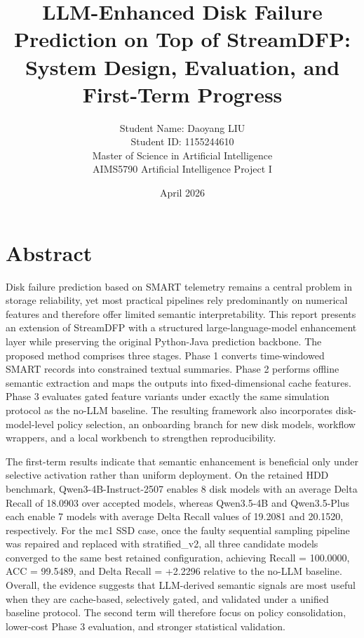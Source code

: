 \documentclass[
  11pt,
  a4paper]{article}
\title{LLM-Enhanced Disk Failure Prediction on Top of StreamDFP: System
Design, Evaluation, and First-Term Progress}
\author{Student Name: Daoyang LIU\\
Student ID: 1155244610\\
Master of Science in Artificial Intelligence\\
AIMS5790 Artificial Intelligence Project I}
\date{April 2026}
\begin{document}
\hypersetup{pageanchor=false}


\hypersetup{pageanchor=true}
{
\setcounter{tocdepth}{2}
\footnotesize
{}
\setlength{\parskip}{0pt}
\tableofcontents
}
\clearpage
{}
\hypertarget{abstract}{%
\section{Abstract}\label{abstract}}

Disk failure prediction based on SMART telemetry remains a central
problem in storage reliability, yet most practical pipelines rely
predominantly on numerical features and therefore offer limited semantic
interpretability. This report presents an extension of StreamDFP with a
structured large-language-model enhancement layer while preserving the
original Python-Java prediction backbone. The proposed method comprises
three stages. Phase 1 converts time-windowed SMART records into
constrained textual summaries. Phase 2 performs offline semantic
extraction and maps the outputs into fixed-dimensional cache features.
Phase 3 evaluates gated feature variants under exactly the same
simulation protocol as the no-LLM baseline. The resulting framework also
incorporates disk-model-level policy selection, an onboarding branch for
new disk models, workflow wrappers, and a local workbench to strengthen
reproducibility.

The first-term results indicate that semantic enhancement is beneficial
only under selective activation rather than uniform deployment. On the
retained HDD benchmark, Qwen3-4B-Instruct-2507 enables 8 disk models
with an average Delta Recall of 18.0903 over accepted models, whereas
Qwen3.5-4B and Qwen3.5-Plus each enable 7 models with average Delta
Recall values of 19.2081 and 20.1520, respectively. For the mc1 SSD
case, once the faulty sequential sampling pipeline was repaired and
replaced with stratified\_v2, all three candidate models converged to
the same best retained configuration, achieving Recall = 100.0000, ACC =
99.5489, and Delta Recall = +2.2296 relative to the no-LLM baseline.
Overall, the evidence suggests that LLM-derived semantic signals are
most useful when they are cache-based, selectively gated, and validated
under a unified baseline protocol. The second term will therefore focus
on policy consolidation, lower-cost Phase 3 evaluation, and stronger
statistical validation.
\end{document}
